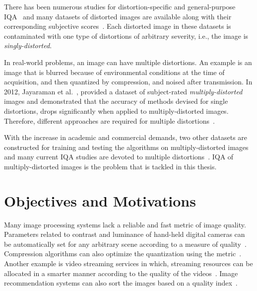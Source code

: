 There has been numerous studies for distortion-specific and general-purpose IQA~\cite{lin2010perceptual, Chikkerur2011, xu2017no, Manap2015, borse2014competitive} and many datasets of distorted images are available along with their corresponding subjective scores~\cite{Sheikh,Chandler2010,Ponomarenko2015,Ponomarenko2009,Horita}. Each distorted image in these datasets is contaminated with one type of distortions of arbitrary severity, i.e., the image is \emph{singly-distorted}.

In real-world problems, an image can have multiple distortions. An example is an image that is blurred because of environmental conditions at the time of acquisition, and then quantized by compression, and noised after transmission. In 2012, Jayaraman et al.~\cite{Jayaraman2012}, provided a dataset of subject-rated \emph{multiply-distorted} images and demonstrated that the accuracy of methods devised for single distortions, drops significantly when applied to multiply-distorted images. Therefore, different approaches are required for multiple distortions~\cite{Li2016}.

With the increase in academic and commercial demands, two other datasets are constructed for training and testing the algorithms on multiply-distorted images~\cite{Sun2017, Gu2014} and many current IQA studies are devoted to multiple distortions~\cite{Li2016,Gu2014,Dai2018,Chetouani2016,Chetouani2015,Li2018a,Mahmoudpour2018,Mahmoudpour2017,Gu2013,miao2019quality,wang2019blind, zhang2019full, lu2015no}. IQA of multiply-distorted images is the problem that is tackled in this thesis.
\section{Objectives and Motivations}
Many image processing systems lack a reliable and fast metric of image quality. Parameters related to contrast and luminance of hand-held digital cameras can be automatically set for any arbitrary scene according to a measure of quality~\cite{Alakarhu2007}. Compression algorithms can also optimize the quantization using the metric~\cite{Zhai2008,Zhang2011}. Another example is video streaming services in which, streaming resources can be allocated in a smarter manner according to the quality of the videos~\cite{Anegekuh2015}. Image recommendation systems can also sort the images based on a quality index~\cite{Gaur2014}.

